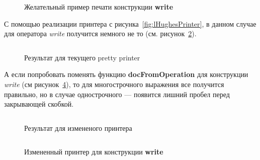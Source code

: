\begin{figure}[h!]
	\inputminted{pascal}{codes/lGoodWriteEx.l}
	\caption{Желательный пример печати конструкции \textbf{write}}
	\label{fig:lGoodWriteEx}
\end{figure}

С помощью реализации принтера с рисунка~\ref{fig:lHughesPrinter}, в данном случае для оператора \textit{write} получится немного не то (см. рисунок~\ref{fig:lCurWriteEx}).
\begin{figure}[h!]
	\inputminted{pascal}{codes/lCurWriteEx.l}
	\caption{Результат для текущего pretty printer}
	\label{fig:lCurWriteEx}
\end{figure}

А если попробовать поменять функцию \textbf{docFromOperation} для конструкции \textit{write} (см рисунок~\ref{fig:lHughesWriteChange}),
то для многострочного выражения все получится правильно, но в случае однострочного --- появится лишний пробел перед закрывающей скобкой.

\begin{figure}[h!]
	\inputminted{pascal}{codes/lBadWriteEx.l}
	\caption{Результат для измененого принтера}
	\label{fig:lBadWriteEx}
\end{figure}

\begin{figure}[h!]
	\inputminted{haskell}{codes/lHughesWriteChange.hs}
	\caption{Измененный принтер для конструкции \textbf{write}}
	\label{fig:lHughesWriteChange}
\end{figure}